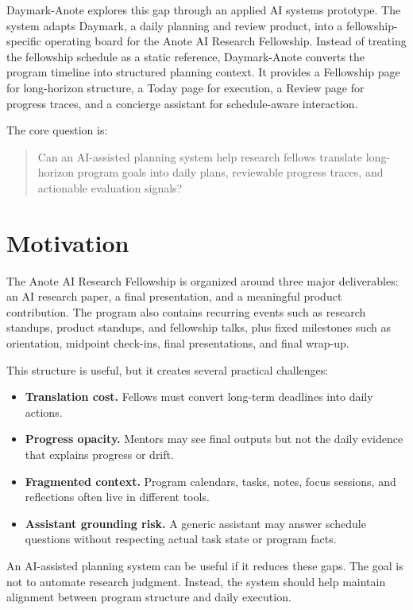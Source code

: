 \documentclass[11pt]{article}
\begin{document}
Daymark-Anote explores this gap through an applied AI systems prototype. The system adapts Daymark, a daily planning and review product, into a fellowship-specific operating board for the Anote AI Research Fellowship. Instead of treating the fellowship schedule as a static reference, Daymark-Anote converts the program timeline into structured planning context. It provides a Fellowship page for long-horizon structure, a Today page for execution, a Review page for progress traces, and a concierge assistant for schedule-aware interaction.

The core question is:

\begin{quote}
Can an AI-assisted planning system help research fellows translate long-horizon program goals into daily plans, reviewable progress traces, and actionable evaluation signals?
\end{quote}

\section{Motivation}

The Anote AI Research Fellowship is organized around three major deliverables: an AI research paper, a final presentation, and a meaningful product contribution. The program also contains recurring events such as research standups, product standups, and fellowship talks, plus fixed milestones such as orientation, midpoint check-ins, final presentations, and final wrap-up.

This structure is useful, but it creates several practical challenges:

\begin{itemize}[leftmargin=*]
  \item \textbf{Translation cost.} Fellows must convert long-term deadlines into daily actions.
  \item \textbf{Progress opacity.} Mentors may see final outputs but not the daily evidence that explains progress or drift.
  \item \textbf{Fragmented context.} Program calendars, tasks, notes, focus sessions, and reflections often live in different tools.
  \item \textbf{Assistant grounding risk.} A generic assistant may answer schedule questions without respecting actual task state or program facts.
\end{itemize}

An AI-assisted planning system can be useful if it reduces these gaps. The goal is not to automate research judgment. Instead, the system should help maintain alignment between program structure and daily execution.
\end{document}
